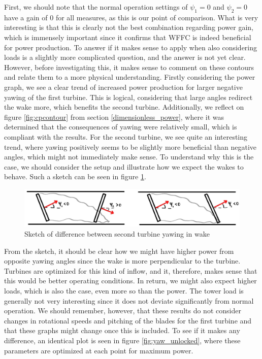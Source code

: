 First, we should note that the normal operation settings of $\psi_1=0$ and $\psi_2 = 0$ have a gain of 0 for all measures, as this is our point of comparison. What is very interesting is that this is clearly not the best combination regarding power gain, which is immensely important since it confirms that WFFC is indeed beneficial for power production. To answer if it makes sense to apply when also considering loads is a slightly more complicated question, and the answer is not yet clear. However, before investigating this, it makes sense to comment on these contours and relate them to a more physical understanding. Firstly considering the power graph, we see a clear trend of increased power production for larger negative yawing of the first turbine. This is logical, considering that large angles redirect the wake more, which benefits the second turbine. Additionally, we reflect on figure \ref{fig:cpcontour} from section \ref{dimensionless_power}, where it was determined that the consequences of yawing were relatively small, which is compliant with the results. For the second turbine, we see quite an interesting trend, where yawing positively seems to be slightly more beneficial than negative angles, which might not immediately make sense. To understand why this is the case, we should consider the setup and illustrate how we expect the wakes to behave. Such a sketch can be seen in figure \ref{fig:yaw_negative_positive}.

\begin{figure}[H]
    \centering
    \includegraphics[scale=0.23]{Illustrations/yaw_negative_positive.jpg}
    \caption{Sketch of difference between second turbine yawing in wake}
    \label{fig:yaw_negative_positive}
\end{figure}

From the sketch, it should be clear how we might have higher power from opposite yawing angles since the wake is more perpendicular to the turbine. Turbines are optimized for this kind of inflow, and it, therefore, makes sense that this would be better operating conditions. In return, we might also expect higher loads, which is also the case, even more so than the power. The tower load is generally not very interesting since it does not deviate significantly from normal operation. We should remember, however, that these results do not consider changes in rotational speeds and pitching of the blades for the first turbine and that these graphs might change once this is included. To see if it makes any difference, an identical plot is seen in figure \ref{fig:yaw_unlocked}, where these parameters are optimized at each point for maximum power.

